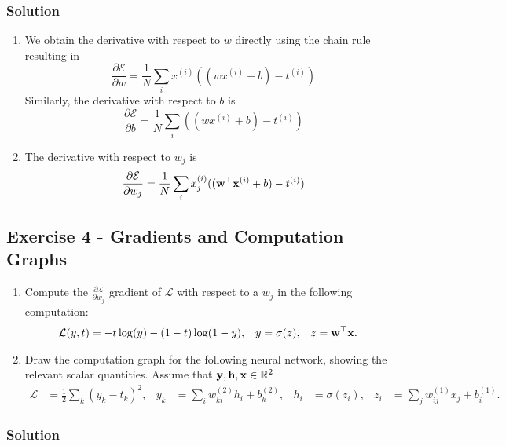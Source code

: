 \documentclass[
  letterpaper,
  DIV=11,
  numbers=noendperiod]{scrartcl}
\begin{document}
\subsubsection{Solution}\label{solution-2}

\begin{enumerate}
\def\labelenumi{(\alph{enumi})}
\item
  We obtain the derivative with respect to \(w\) directly using the
  chain rule resulting in \[
  \frac{\partial \mathcal{E}}{\partial w} 
    = \frac{1}{N}\sum_i x^{(i)}((w x^{(i)} + b) - t^{(i)}) 
  \] Similarly, the derivative with respect to \(b\) is \[
  \frac{\partial \mathcal{E}}{\partial b} 
    = \frac{1}{N}\sum_i ((w x^{(i)} + b) - t^{(i)})
  \]
\item
  The derivative with respect to \(w_j\) is \[
  \frac{\partial \mathcal{E}}{\partial w_j} 
    = \frac{1}{N}\sum_i x_j^{(i)}((\mathbf{w}^\top \mathbf{x}^{(i)}+b) - t^{(i)})
  \]
\end{enumerate}

\subsection{Exercise 4 - Gradients and Computation
Graphs}\label{exercise-4---gradients-and-computation-graphs}

\begin{enumerate}
\def\labelenumi{(\alph{enumi})}
\item
  Compute the \(\frac{\partial \mathcal{L}}{\partial w_j}\) gradient of
  \(\mathcal{L}\) with respect to a \(w_j\) in the following
  computation: \begin{align*} 
    \mathcal{L}(y, t) &= - t \log(y) - (1-t) \log(1-y) ,
  & y &= \sigma(z) ,
  &  z &= {\bf w}^\top {\bf x} .
    \end{align*}
\item
  Draw the computation graph for the following neural network, showing
  the relevant scalar quantities. Assume that
  \(\mathbf{y}, \mathbf{h}, \mathbf{x} \in \mathbb{R}^2\) \begin{align*}
    \mathcal{L} &= \frac{1}{2}\sum_k (y_k - t_k)^2 , 
  & y_k &= \sum_i w_{ki}^{(2)} h_i + b_k^{(2)} , 
  & h_i &= \sigma(z_i) ,
  & z_i &= \sum_j w_{ij}^{(1)} x_j + b_i^{(1)} .
    \end{align*}
\end{enumerate}

\subsubsection{Solution}\label{solution-3}
\end{document}
